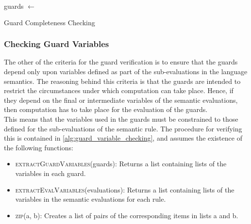 \begin{algorithm}[!htb]
\begin{algorithmic}
    \State guards $\gets$ 
            \State {}
        \EndIf
    \EndFor
    \State {}
\EndFunction
\end{algorithmic}
\caption{Guard Completeness Checking}
\label{alg:guard_completeness_checking}
\end{algorithm}


\subsubsection{Checking Guard Variables} %
\label{ssub:checking_guard_variables}
The other of the criteria for the guard verification is to ensure that the guards depend only upon variables defined as part of the sub-evaluations in the language semantics.
The reasoning behind this criteria is that the guards are intended to restrict the circumstances under which computation can take place. 
Hence, if they depend on the final or intermediate variables of the semantic evaluations, then computation has to take place for the evaluation of the guards.\\

This means that the variables used in the guards must be constrained to those defined for the sub-evaluations of the semantic rule.
The procedure for verifying this is contained in \autoref{alg:guard_variable_checking}, and assumes the existence of the following functions:
\begin{itemize}
    \item \textsc{extractGuardVariables}(guards): Returns a list containing lists of the variables in each guard.
    \item \textsc{extractEvalVariables}(evaluations): Returns a list containing lists of the variables in the semantic evaluations for each rule.
    \item \textsc{zip}(a, b): Creates a list of pairs of the corresponding items in lists a and b.
\end{itemize}

